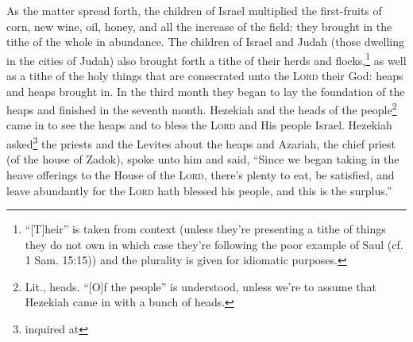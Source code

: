 
\begin{inparaenum}
     As the matter spread forth, the children of Israel multiplied the first-fruits of corn, new wine, oil, honey, and all the increase of the field: they brought in the tithe of the whole in abundance.%
     The children of Israel and Judah (those dwelling in the cities of Judah) also brought forth a tithe of their herds and flocks,\footnote{``[T]heir'' is taken from context (unless they're presenting a tithe of things they do not own in which case they're following the poor example of Saul (cf. 1 Sam. 15:15)) and the plurality is given for idiomatic purposes.} as well as a tithe of the holy things that are consecrated unto the \textsc{Lord} their God: heaps and heaps brought in.%
     In the third month they began to lay the foundation of the heaps and finished in the seventh month.%
     Hezekiah and the heads of the people\footnote{Lit., heads. ``[O]f the people'' is understood, unless we're to assume that Hezekiah came in with a bunch of heads.} came in to see the heaps and to bless the \textsc{Lord} and His people Israel.%
     Hezekiah asked\footnote{inquired at} the priests and the Levites about the heaps%
     and Azariah, the chief priest (of the house of Zadok), spoke unto him and said, ``Since we began taking in the heave offerings to the House of the \textsc{Lord}, there's plenty to eat, be satisfied, and leave abundantly for the \textsc{Lord} hath blessed his people, and this is the surplus.''%
\end{inparaenum}
